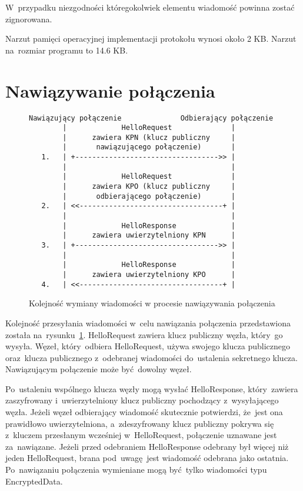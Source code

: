 W~przypadku niezgodności któregokolwiek elementu wiadomość powinna zostać zignorowana.

Narzut pamięci operacyjnej implementacji protokołu wynosi około 2 KB. Narzut na~rozmiar programu to 14.6 KB.

\section{Nawiązywanie połączenia}

\begin{figure}[ht]
\centering
\begin{BVerbatim}
Nawiązujący połączenie              Odbierający połączenie
        |             HelloRequest              |
        |      zawiera KPN (klucz publiczny     |
        |       nawiązującego połączenie)       |
   1.   | +---------------------------------->> |
        |                                       |
        |             HelloRequest              |
        |      zawiera KPO (klucz publiczny     |
        |       odbierającego połączenie)       |
   2.   | <<----------------------------------+ |
        |                                       |
        |             HelloResponse             |
        |      zawiera uwierzytelniony KPN      |
   3.   | +---------------------------------->> |
        |                                       |
        |             HelloResponse             |
        |      zawiera uwierzytelniony KPO      |
   4.   | <<----------------------------------+ |
\end{BVerbatim}
\caption{Kolejność wymiany wiadomości w procesie nawiązywania połączenia}
\label{fig:handshake}
\end{figure}

Kolejność przesyłania wiadomości w~celu nawiązania połączenia przedstawiona została na~rysunku~\ref{fig:handshake}. HelloRequest zawiera klucz publiczny węzła, który~go wysyła. Węzeł, który~odbiera HelloRequest, używa swojego klucza publicznego oraz~klucza publicznego z~odebranej wiadomości do~ustalenia sekretnego klucza. Nawiązującym połączenie może być dowolny węzeł.

Po~ustaleniu wspólnego klucza węzły mogą wysłać HelloResponse, który~zawiera zaszyfrowany i~uwierzytelniony klucz publiczny pochodzący z~wysyłającego węzła. Jeżeli węzeł odbierający wiadomość skutecznie potwierdzi, że~jest ona prawidłowo uwierzytelniona, a~zdeszyfrowany klucz publiczny pokrywa się z~kluczem przesłanym wcześniej w~HelloRequest, połączenie uznawane jest za~nawiązane. Jeżeli przed odebraniem HelloResponse odebrany był więcej niż jeden HelloRequest, brana pod~uwagę jest wiadomość odebrana jako ostatnia. Po~nawiązaniu połączenia wymieniane mogą być tylko wiadomości typu EncryptedData.

